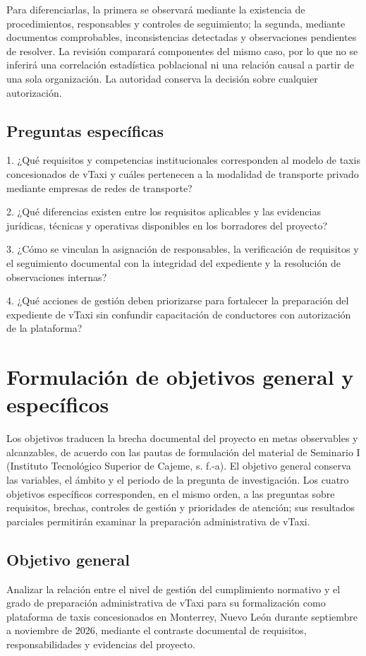 {Para diferenciarlas, la primera se observará mediante la existencia de procedimientos, responsables y controles de seguimiento; la segunda, mediante documentos comprobables, inconsistencias detectadas y observaciones pendientes de resolver. La revisión comparará componentes del mismo caso, por lo que no se inferirá una correlación estadística poblacional ni una relación causal a partir de una sola organización. La autoridad conserva la decisión sobre cualquier autorización.


\subsection{Preguntas específicas}
1. ¿Qué requisitos y competencias institucionales corresponden al modelo de taxis concesionados de vTaxi y cuáles pertenecen a la modalidad de transporte privado mediante empresas de redes de transporte?


2. ¿Qué diferencias existen entre los requisitos aplicables y las evidencias jurídicas, técnicas y operativas disponibles en los borradores del proyecto?


3. ¿Cómo se vinculan la asignación de responsables, la verificación de requisitos y el seguimiento documental con la integridad del expediente y la resolución de observaciones internas?


4. ¿Qué acciones de gestión deben priorizarse para fortalecer la preparación del expediente de vTaxi sin confundir capacitación de conductores con autorización de la plataforma?


\section{Formulación de objetivos general y específicos}
Los objetivos traducen la brecha documental del proyecto en metas observables y alcanzables, de acuerdo con las pautas de formulación del material de Seminario I (Instituto Tecnológico Superior de Cajeme, s. f.-a). El objetivo general conserva las variables, el ámbito y el periodo de la pregunta de investigación. Los cuatro objetivos específicos corresponden, en el mismo orden, a las preguntas sobre requisitos, brechas, controles de gestión y prioridades de atención; sus resultados parciales permitirán examinar la preparación administrativa de vTaxi.


\subsection{Objetivo general}
Analizar la relación entre el nivel de gestión del cumplimiento normativo y el grado de preparación administrativa de vTaxi para su formalización como plataforma de taxis concesionados en Monterrey, Nuevo León durante septiembre a noviembre de 2026, mediante el contraste documental de requisitos, responsabilidades y evidencias del proyecto.


}
